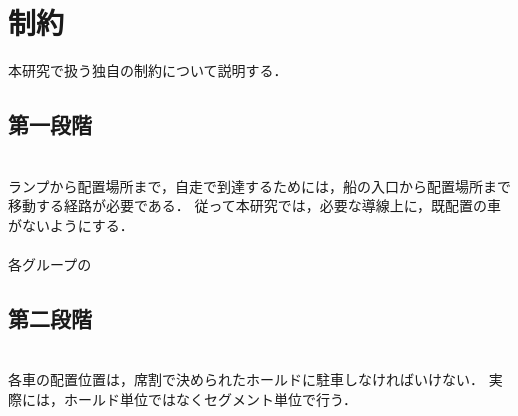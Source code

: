     

    
    
    


\section{制約}
本研究で扱う独自の制約について説明する．
\subsection*{第一段階}
\\
ランプから配置場所まで，自走で到達するためには，船の入口から配置場所まで移動する経路が必要である．
従って本研究では，必要な導線上に，既配置の車がないようにする．\\

\\
各グループの
\subsection*{第二段階}
\\
各車の配置位置は，席割で決められたホールドに駐車しなければいけない．
実際には，ホールド単位ではなくセグメント単位で行う．\\

